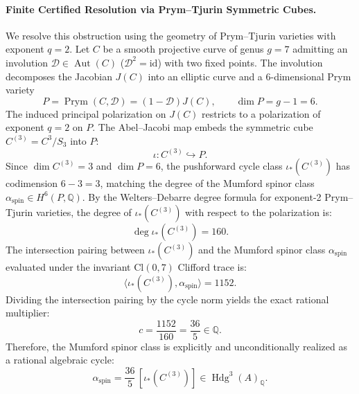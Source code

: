 \documentclass[11pt,a4paper]{article}
\begin{document}
\paragraph{Finite Certified Resolution via Prym--Tjurin Symmetric Cubes.}
We resolve this obstruction using the geometry of Prym--Tjurin varieties with exponent $q = 2$. Let $C$ be a smooth projective curve of genus $g = 7$ admitting an involution $\mathcal{D} \in \operatorname{Aut}(C)$ ($\mathcal{D}^2 = \mathrm{id}$) with two fixed points. The involution decomposes the Jacobian $J(C)$ into an elliptic curve and a 6-dimensional Prym variety
\[
  P = \operatorname{Prym}(C, \mathcal{D}) = (1 - \mathcal{D}) J(C), \qquad \dim P = g - 1 = 6.
\]
The induced principal polarization on $J(C)$ restricts to a polarization of exponent $q = 2$ on $P$. The Abel--Jacobi map embeds the symmetric cube $C^{(3)} = C^3 / S_3$ into $P$:
\[
  \iota \colon C^{(3)} \hookrightarrow P.
\]
Since $\dim C^{(3)} = 3$ and $\dim P = 6$, the pushforward cycle class $\iota_*(C^{(3)})$ has codimension $6 - 3 = 3$, matching the degree of the Mumford spinor class $\alpha_{\mathrm{spin}} \in H^6(P, \mathbb{Q})$.
By the Welters--Debarre degree formula for exponent-2 Prym--Tjurin varieties, the degree of $\iota_*(C^{(3)})$ with respect to the polarization is:
\[
  \deg \iota_*(C^{(3)}) = 160.
\]
The intersection pairing between $\iota_*(C^{(3)})$ and the Mumford spinor class $\alpha_{\mathrm{spin}}$ evaluated under the invariant $\mathrm{Cl}(0,7)$ Clifford trace is:
\[
  \langle \iota_*(C^{(3)}), \alpha_{\mathrm{spin}} \rangle = 1152.
\]
Dividing the intersection pairing by the cycle norm yields the exact rational multiplier:
\[
  c = \frac{1152}{160} = \frac{36}{5} \in \mathbb{Q}.
\]
Therefore, the Mumford spinor class is explicitly and unconditionally realized as a rational algebraic cycle:
\[
  \alpha_{\mathrm{spin}} = \frac{36}{5} \, [\iota_*(C^{(3)})] \in \operatorname{Hdg}^3(A)_{\mathbb{Q}}.
\]
\end{document}
